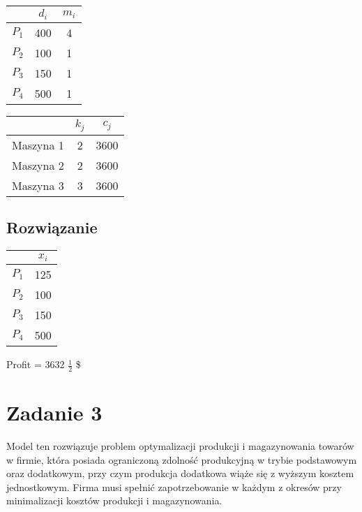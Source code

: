 \documentclass[12pt, letterpaper]{article}
\begin{document}
\begin{center}
  \begin{tabular}{|c|c|c|}
    \hline
              & \( d_i \) & \( m_i \) \\
    \hline
    \( P_1 \) & 400       & 4         \\
    \( P_2 \) & 100       & 1         \\
    \( P_3 \) & 150       & 1         \\
    \( P_4 \) & 500       & 1         \\
    \hline
  \end{tabular}
\end{center}

\begin{center}
  \begin{tabular}{|c|c|c|}
    \hline
              & \( k_j \) & \( c_j \) \\
    \hline
    Maszyna 1 & 2         & 3600      \\
    Maszyna 2 & 2         & 3600      \\
    Maszyna 3 & 3         & 3600      \\
    \hline
  \end{tabular}
\end{center}

\subsection{Rozwiązanie}
\begin{center}
  \begin{tabular}{|c|c|}
    \hline
              & \( x_{i} \) \\
    \hline
    \( P_1 \) & 125         \\
    \( P_2 \) & 100         \\
    \( P_3 \) & 150         \\
    \( P_4 \) & 500         \\
    \hline
  \end{tabular}
\end{center}

Profit = 3632 $\frac{1}{2}$ \$

\section{Zadanie 3}

Model ten rozwiązuje problem optymalizacji produkcji i magazynowania towarów w
firmie, która posiada ograniczoną zdolność produkcyjną w trybie podstawowym
oraz dodatkowym, przy czym produkcja dodatkowa wiąże się z wyższym kosztem
jednostkowym. Firma musi spełnić zapotrzebowanie w każdym z okresów przy
minimalizacji kosztów produkcji i magazynowania.
\end{document}
